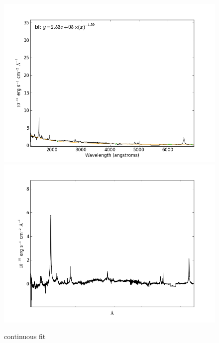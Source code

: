 \documentclass[usenatbib]{mn2e}
\begin{document}
\begin{figure}
\begin{center}
\includegraphics[width=0.46\linewidth,angle=0]{continuous_10.png}
\vspace{5mm}
\includegraphics[width=0.49\linewidth,angle=0]{no_continuous_10.png}\\

\end{center} 
\caption{continuous fit \label{fig:landscape}}   
\end{figure}

\newpage
\end{document}
